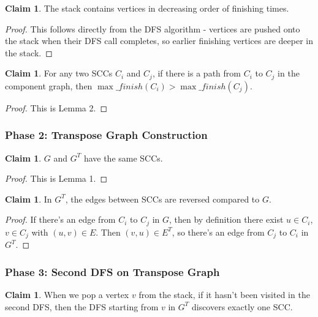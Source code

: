 \documentclass{book}
\theoremstyle{definition}
\newtheorem{claim}[definition]{Claim}
\begin{document}
\begin{claim}
The stack contains vertices in decreasing order of finishing times.
\end{claim}

\begin{proof}
This follows directly from the DFS algorithm - vertices are pushed onto the stack when their DFS call completes, so earlier finishing vertices are deeper in the stack.
\end{proof}

\begin{claim}
For any two SCCs $C_i$ and $C_j$, if there is a path from $C_i$ to $C_j$ in the component graph, then $\max\_finish(C_i) > \max\_finish(C_j)$.
\end{claim}

\begin{proof}
This is Lemma 2.
\end{proof}

\subsubsection{Phase 2: Transpose Graph Construction}

\begin{claim}
$G$ and $G^T$ have the same SCCs.
\end{claim}

\begin{proof}
This is Lemma 1.
\end{proof}

\begin{claim}
In $G^T$, the edges between SCCs are reversed compared to $G$.
\end{claim}

\begin{proof}
If there's an edge from $C_i$ to $C_j$ in $G$, then by definition there exist $u \in C_i$, $v \in C_j$ with $(u, v) \in E$. Then $(v, u) \in E^T$, so there's an edge from $C_j$ to $C_i$ in $G^T$.
\end{proof}

\subsubsection{Phase 3: Second DFS on Transpose Graph}

\begin{claim}
When we pop a vertex $v$ from the stack, if it hasn't been visited in the second DFS, then the DFS starting from $v$ in $G^T$ discovers exactly one SCC.
\end{claim}
\end{document}
